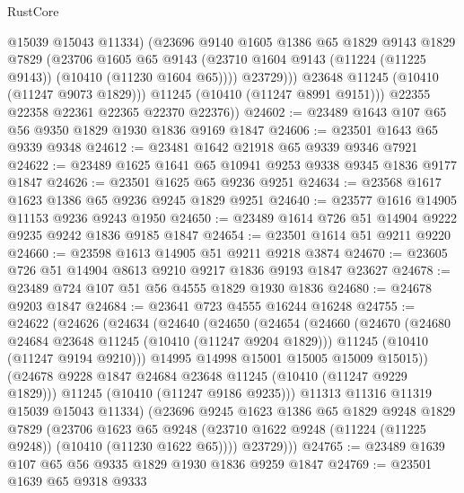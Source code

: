 \begin{lexlean}{RustCore}
\begin{coremodule}
                  @15039
                  @15043
                  @11334)
                (@23696
                  @9140
                  @1605
                  @1386
                  @65
                  @1829
                  @9143
                  @1829
                  @7829
                  (@23706
                    @1605
                    @65
                    @9143
                    (@23710 @1604 @9143 (@11224 (@11225 @9143)) (@10410 (@11230 @1604 @65))))
                  @23729)))
            @23648
            @11245
            (@10410 (@11247 @9073 @1829)))
          @11245
          (@10410 (@11247 @8991 @9151)))
        @22355
        @22358
        @22361
        @22365
        @22370
        @22376))
@24602 := @23489 @1643 @107 @65 @56 @9350 @1829 @1930 @1836 @9169 @1847
@24606 := @23501 @1643 @65 @9339 @9348
@24612 := @23481 @1642 @21918 @65 @9339 @9346 @7921
@24622 := @23489 @1625 @1641 @65 @10941 @9253 @9338 @9345 @1836 @9177 @1847
@24626 := @23501 @1625 @65 @9236 @9251
@24634 := @23568 @1617 @1623 @1386 @65 @9236 @9245 @1829 @9251
@24640 := @23577 @1616 @14905 @11153 @9236 @9243 @1950
@24650 := @23489 @1614 @726 @51 @14904 @9222 @9235 @9242 @1836 @9185 @1847
@24654 := @23501 @1614 @51 @9211 @9220
@24660 := @23598 @1613 @14905 @51 @9211 @9218 @3874
@24670 := @23605 @726 @51 @14904 @8613 @9210 @9217 @1836 @9193 @1847 @23627
@24678 := @23489 @724 @107 @51 @56 @4555 @1829 @1930 @1836
@24680 := @24678 @9203 @1847
@24684 := @23641 @723 @4555 @16244 @16248
@24755 := @24622
    (@24626
      (@24634
        (@24640
          (@24650
            (@24654
              (@24660
                (@24670
                  (@24680 @24684 @23648 @11245 (@10410 (@11247 @9204 @1829)))
                  @11245
                  (@10410 (@11247 @9194 @9210)))
                @14995
                @14998
                @15001
                @15005
                @15009
                @15015))
            (@24678 @9228 @1847 @24684 @23648 @11245 (@10410 (@11247 @9229 @1829)))
            @11245
            (@10410 (@11247 @9186 @9235)))
          @11313
          @11316
          @11319
          @15039
          @15043
          @11334)
        (@23696
          @9245
          @1623
          @1386
          @65
          @1829
          @9248
          @1829
          @7829
          (@23706
            @1623
            @65
            @9248
            (@23710 @1622 @9248 (@11224 (@11225 @9248)) (@10410 (@11230 @1622 @65))))
          @23729)))
@24765 := @23489 @1639 @107 @65 @56 @9335 @1829 @1930 @1836 @9259 @1847
@24769 := @23501 @1639 @65 @9318 @9333

\end{coremodule}
\end{lexlean}
